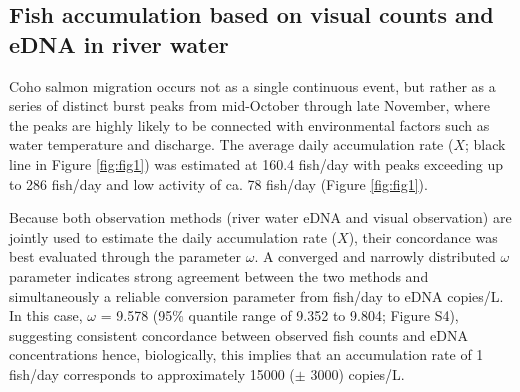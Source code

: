 \documentclass{article}
\begin{document}
\subsection{Fish accumulation based on visual counts and eDNA in river water}
Coho salmon migration occurs not as a single continuous event, but rather as a series of distinct burst peaks from mid-October through late November, where the peaks are highly likely to be connected with environmental factors such as water temperature and discharge. The average daily accumulation rate ($X$; black line in Figure \ref{fig:fig1}) was estimated at 160.4 fish/day with peaks exceeding up to 286 fish/day and low activity of ca. 78 fish/day (Figure \ref{fig:fig1}).

Because both observation methods (river water eDNA and visual observation) are jointly used to estimate the daily accumulation rate ($X$), their concordance was best evaluated through the parameter $\omega$. A converged and narrowly distributed $\omega$ parameter indicates strong agreement between the two methods and simultaneously a reliable conversion parameter from fish/day to eDNA copies/L. In this case, $\omega$ = 9.578 (95\% quantile range of 9.352 to 9.804; Figure S4), suggesting consistent concordance between observed fish counts and eDNA concentrations hence, biologically, this implies that an accumulation rate of 1 fish/day corresponds to approximately 15000 ($\pm$ 3000) copies/L.
\end{document}
